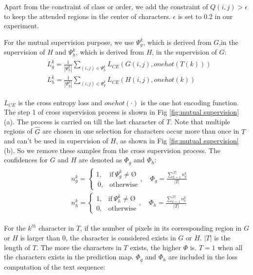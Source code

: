 \documentclass[letterpaper]{article} \usepackage{aaai20}  \usepackage{times}  \usepackage{helvet} \usepackage{courier}  \usepackage[hyphens]{url}  \usepackage{graphicx} \urlstyle{rm} \def\UrlFont{\rm}  \usepackage{graphicx}  \frenchspacing  \setlength{\pdfpagewidth}{8.5in}  \setlength{\pdfpageheight}{11in}
\begin{document}
Apart from the constraint of class or order, we add the constraint of $Q(i,j)>\epsilon$ to keep the attended regions in the center of characters. $\epsilon$ is set to 0.2 in our experiment.
 
 
 For the mutual supervision purpose, we use ${\Psi}_{g}^{k}$, which is derived from $G$,in the supervision of $H$ and ${\Psi}_{h}^{k}$, which is derived from $H$, in the supervision of $G$:
  \begin{align}
 \begin{split}
 &L_{g}^{k} = \frac{1}{|{\Psi}_{h}^{k}|}\sum_{(i,j) \in {\Psi}_{h}^{k}}L_{CE}(G(i,j), onehot(T(k))) \\
 &L_{h}^{k} = \frac{1}{|{\Psi}_{g}^{k}|}\sum_{(i,j) \in {\Psi}_{g}^{k}}L_{CE}(H(i,j), onehot(k))
 \end{split}
 \end{align}
 
$L_{CE}$ is the cross entropy loss and $onehot(\cdot)$ is the one hot encoding function. The step 1 of cross supervision process is shown in Fig \ref{fig:mutual supervision}(a). The process is carried on till the last character of $T$. Note that multiple regions of $\hat{G}$ are chosen in one selection for characters occur more than once in $T$ and can't be used in supervision of $H$, as shown in Fig \ref{fig:mutual supervision}(b). So we remove these samples from the cross supervision process. The confidences for $G$ and $H$ are denoted as ${\Phi}_{g}$ and ${\Phi}_{h}$:
\begin{align}
 \begin{split}
&n_{g}^{k}=\begin{cases}1,  & \text{if} \ {\Psi}_{g}^{k} \neq \text{\O} \\\
0, & \text{otherwise}
 \end{cases}, \quad
 \Phi_{g} = \frac{\sum_{k=1}^{|T|}n_{g}^{k}}{|T|}\\
 &n_{h}^{k}=\begin{cases}1,  & \text{if} \ {\Psi}_{h}^{k} \neq \text{\O}  \\
 0, & \text{otherwise}
 \end{cases}, \quad
 \Phi_{h} = \frac{\sum_{k=1}^{|T|}n_{h}^{k}}{|T|}
 \end{split}
 \end{align}
 
 For the $k^{th}$ character in $T$, if the number of pixels in its corresponding region in $G$ or $H$ is larger than 0, the character is considered exists in $G$ or $H$. $|T|$ is the length of $T$. The more the characters in $T$ exists, the higher $\Phi$ is. $T=1$ when all the characters exists in the prediction map. $\Phi_{g}$ and $\Phi_{h}$ are included in the loss computation of the text sequence:
\end{document}
